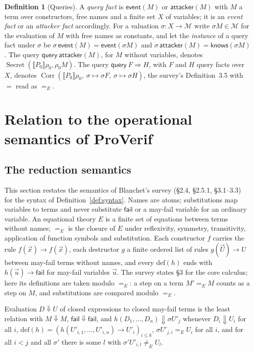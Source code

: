 \documentclass[11pt]{article}
\theoremstyle{definition}
\newtheorem{definition}{Definition}[section]
\theoremstyle{plain}
\theoremstyle{remark}
\newcommand{\Msg}{\mathcal{M}}
\newcommand{\knows}{\pv{knows}}
\newcommand{\Secret}{\operatorname{Secret}}
\newcommand{\Corr}{\operatorname{Corr}}
\newcommand{\sem}[1]{\llbracket #1 \rrbracket}
\newcommand{\pv}[1]{\mathsf{#1}}
\newcommand{\fail}{\pv{fail}}
\newcommand{\ev}{\Downarrow}
\newcommand{\attacker}{\pv{attacker}}
\newcommand{\event}{\pv{event}}
\begin{document}
\begin{definition}[Queries]\label{def:queries}
A \emph{query fact} is $\event(M)$ or $\attacker(M)$ with $M$ a term over constructors, free names and a finite set $X$ of variables; it is an \emph{event fact} or an \emph{attacker fact} accordingly. For a valuation $\sigma:X\to\Msg$ write $\sigma M\in\Msg$ for the evaluation of $M$ with free names as constants, and let the \emph{instance} of a query fact under $\sigma$ be $\sigma\,\event(M)=\event(\sigma M)$ and $\sigma\,\attacker(M)=\knows(\sigma M)$.
The query $\pv{query}\ \attacker(M)$, for $M$ without variables, denotes $\Secret(\sem{P_0}\rho_0,\rho_0M)$. The query $\pv{query}\ F\Longrightarrow H$, with $F$ and $H$ query facts over $X$, denotes $\Corr(\sem{P_0}\rho_0,\ \sigma\mapsto\sigma F,\ \sigma\mapsto\sigma H)$, the survey's Definition~3.5 with $=$ read as $=_E$.
\end{definition}

\section{Relation to the operational semantics of ProVerif}

\subsection{The reduction semantics}

This section restates the semantics of Blanchet's survey (\S2.4, \S2.5.1, \S3.1--3.3) for the syntax of Definition~\ref{def:syntax}. Names are atoms; substitutions map variables to terms and never substitute $\fail$ or a may-fail variable for an ordinary variable. An equational theory $E$ is a finite set of equations between terms without names; $=_E$ is the closure of $E$ under reflexivity, symmetry, transitivity, application of function symbols and substitution. Each constructor $f$ carries the rule $f(\vec x)\to f(\vec x)$, each destructor $g$ a finite ordered list of rules $g(\vec U)\to U$ between may-fail terms without names, and every $\mathrm{def}(h)$ ends with $h(\vec u)\to\fail$ for may-fail variables $\vec u$. The survey states \S3 for the core calculus; here its definitions are taken modulo $=_E$: a step on a term $M'=_E M$ counts as a step on $M$, and substitutions are compared modulo $=_E$.

Evaluation $D\ev U$ of closed expressions to closed may-fail terms is the least relation with $M\ev M$, $\fail\ev\fail$, and $h(D_1,\dots,D_n)\ev\sigma U'_j$ whenever $D_i\ev U_i$ for all $i$, $\mathrm{def}(h)=(h(U'_{i,1},\dots,U'_{i,n})\to U'_i)_{i\le k}$, $\sigma U'_{j,i}=_E U_i$ for all $i$, and for all $i<j$ and all $\sigma'$ there is some $l$ with $\sigma'U'_{i,l}\ne_E U_l$.
\end{document}
